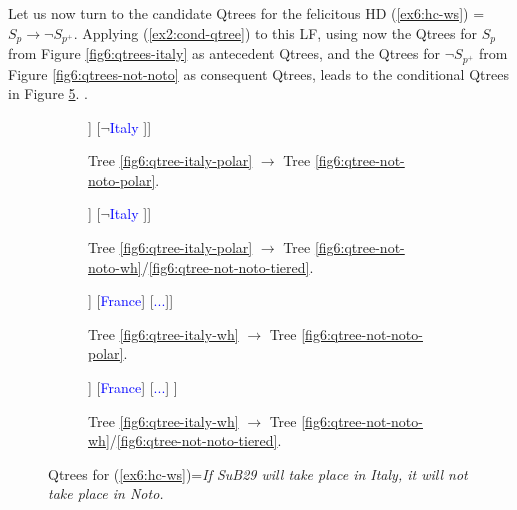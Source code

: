Let us now turn to the candidate Qtrees for the felicitous HD (\ref{ex6:hc-ws}) = $S_p \rightarrow \neg S_{p^+}$. Applying (\ref{ex2:cond-qtree}) to this LF, using now the Qtrees for $S_p$ from Figure \ref{fig6:qtrees-italy} as antecedent Qtrees, and  the Qtrees for $\neg S_{p^+}$ from Figure \ref{fig6:qtrees-not-noto} as consequent Qtrees, leads to the conditional Qtrees in Figure \ref{fig6:qtrees-hc-ws}. 
.
\begin{figure}[H]
\centering
\begin{subfigure}[b]{.45\linewidth}
	\centering
	\scalebox{1}
	{\begin{forest}
			[CS [\textcolor{blue}{Italy} [\textcolor{orange}{Noto}][\fbox{$\neg$\textcolor{orange}{Noto}$\cap$\textcolor{blue}{Italy}}]] [{$\neg$\textcolor{blue}{Italy}} ]]
	\end{forest}}
	\caption{Tree \ref{fig6:qtree-italy-polar} $\rightarrow$ Tree \ref{fig6:qtree-not-noto-polar}.}\label{fig6:tree-hc-ws-polar-polar}
\end{subfigure}\hfill
\begin{subfigure}[b]{.45\linewidth}
	\centering
	\scalebox{1}
	{\begin{forest}
			[CS [\textcolor{blue}{Italy} [\textcolor{orange}{Noto}] [\fbox{\textcolor{orange}{Rome}}] [\fbox{\textcolor{orange}{...}}]] [{$\neg$\textcolor{blue}{Italy}} ]]
	\end{forest}}
	\caption{Tree \ref{fig6:qtree-italy-polar} $\rightarrow$ Tree \ref{fig6:qtree-not-noto-wh}/\ref{fig6:qtree-not-noto-tiered}.}\label{fig6:tree-hc-ws-polar-wh}
\end{subfigure}

\begin{subfigure}[b]{.45\linewidth}
	\centering
	\scalebox{1}
	{\begin{forest}
			[CS [\textcolor{blue}{Italy}[\textcolor{orange}{Noto}][\fbox{$\neg$\textcolor{orange}{Noto}$\cap$\textcolor{blue}{Italy}}]] [\textcolor{blue}{France}] [\textcolor{blue}{...}]]
	\end{forest}}
	\caption{Tree \ref{fig6:qtree-italy-wh} $\rightarrow$ Tree \ref{fig6:qtree-not-noto-polar}.}\label{fig6:tree-hc-ws-wh-polar}
\end{subfigure}\hfill
\begin{subfigure}[b]{.45\linewidth}
	\centering
	\scalebox{1}
	{\begin{forest}
			[CS [\textcolor{blue}{Italy}[\textcolor{orange}{Noto}] [\fbox{\textcolor{orange}{Rome}}] [\fbox{\textcolor{orange}{...}}]] [\textcolor{blue}{France}] [\textcolor{blue}{...}] ]
	\end{forest}}
	\caption{Tree \ref{fig6:qtree-italy-wh} $\rightarrow$ Tree \ref{fig6:qtree-not-noto-wh}/\ref{fig6:qtree-not-noto-tiered}.}\label{fig6:tree-hc-ws-wh-wh}
\end{subfigure}
\caption{Qtrees for (\ref{ex6:hc-ws})=\textit{If SuB29 will take place in Italy, it will not take place in Noto.}}
\label{fig6:qtrees-hc-ws}
\end{figure}


